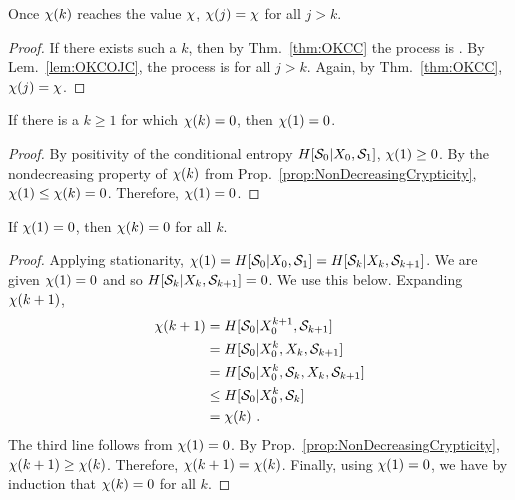 \begin{Cor}
Once $\chi(k)$ reaches the value $\chi$, $\chi(j) = \chi$ for all $j > k$.
\label{cor:ReachChiStayChi}
\end{Cor}

\begin{proof}
If there exists such a $k$, then by Thm.~\ref{thm:OKCC} the process is
. By Lem.~\ref{lem:OKCOJC}, the process is  for all
$j>k$. Again, by Thm.~\ref{thm:OKCC}, $\chi(j) = \chi$.
\end{proof}

\begin{Cor}
If there is a $k \geq 1$ for which $\chi(k)=0$, then $\chi(1)=0$.
\label{cor:Chik0Chi10}
\end{Cor}

\begin{proof}
By positivity of the conditional entropy
$H[\mathcal{S}_0 | {X}_0, \mathcal{S}_1]$, $\chi(1) \ge 0$. By the
nondecreasing property of $\chi(k)$ from Prop.~\ref{prop:NonDecreasingCrypticity},
$\chi(1) \le \chi(k) = 0$. Therefore, $\chi(1) = 0$.
\end{proof}

\begin{Cor}
If $\chi(1)=0$, then $\chi(k) = 0$ for all $k$.
\label{cor:Chi10Chik0}
\end{Cor}

\begin{proof}
Applying stationarity, $\chi(1) = H[\mathcal{S}_0|{X}_0,\mathcal{S}_1]
  = H[\mathcal{S}_k | {X}_k, \mathcal{S}_{k+1}]$. We are given
$\chi(1) = 0$ and so $H[\mathcal{S}_k | {X}_k, \mathcal{S}_{k+1}] = 0$.
We use this below. Expanding $\chi(k+1)$,
\begin{align*}
\chi(k+1) &= H[\mathcal{S}_0 | {X}_0^{k+1}, \mathcal{S}_{k+1}]\\
&=  H[\mathcal{S}_0 | {X}_0^{k}, {X}_k, \mathcal{S}_{k+1}]\\
&=  H[\mathcal{S}_0 | {X}_0^{k}, \mathcal{S}_k, {X}_k, \mathcal{S}_{k+1}]\\
&\le  H[\mathcal{S}_0 | {X}_0^{k}, \mathcal{S}_k]\\
&= \chi(k) ~.
\end{align*}
The third line follows from $\chi(1)=0$. 
By Prop.~\ref{prop:NonDecreasingCrypticity}, $\chi(k+1) \ge \chi(k)$. 
Therefore, $\chi(k+1) = \chi(k)$. Finally, using $\chi(1)=0$, we have by 
induction that $\chi(k)=0$ for all $k$.
\end{proof}

